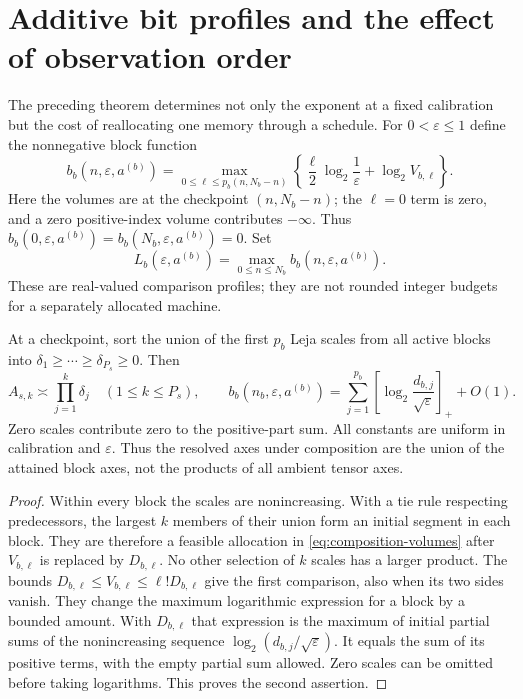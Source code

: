 \section{Additive bit profiles and the effect of observation order}\label{sec:scheduling}
The preceding theorem determines not only the exponent at a fixed
calibration but the cost of reallocating one memory through a schedule.
For $0<\varepsilon\le1$ define the nonnegative block function
\begin{equation}\label{eq:block-bit-function}
 b_b(n,\varepsilon,a^{(b)})=
 \max_{0\le\ell\le p_b(n,N_b-n)}
 \left\{\frac{\ell}{2}\log_2\frac1\varepsilon
             +\log_2 V_{b,\ell}\right\}.
\end{equation}
Here the volumes are at the checkpoint $(n,N_b-n)$; the $\ell=0$
term is zero, and a zero positive-index volume contributes $-\infty$.
Thus $b_b(0,\varepsilon,a^{(b)})=b_b(N_b,\varepsilon,a^{(b)})=0$.
Set
\[
 L_b(\varepsilon,a^{(b)})=
       \max_{0\le n\le N_b}b_b(n,\varepsilon,a^{(b)}).
\]
These are real-valued comparison profiles; they are not rounded integer
budgets for a separately allocated machine.

\begin{lemma}\label{lem:merged-scales}
At a checkpoint, sort the union of the first $p_b$ Leja scales from all
active blocks into $\delta_1\ge\cdots\ge\delta_{P_s}\ge0$. Then
\begin{equation}\label{eq:merged-scales}
 A_{s,k}\asymp\prod_{j=1}^k\delta_j\quad(1\le k\le P_s),
 \qquad
 b_b(n_b,\varepsilon,a^{(b)})=
 \sum_{j=1}^{p_b}\left[\log_2\frac{d_{b,j}}{\sqrt\varepsilon}\right]_+
       +O(1).
\end{equation}
Zero scales contribute zero to the positive-part sum. All constants are
uniform in calibration and $\varepsilon$. Thus the resolved axes under
composition are the union of the attained block axes, not the products
of all ambient tensor axes.
\end{lemma}
\begin{proof}
Within every block the scales are nonincreasing. With a tie rule respecting
predecessors, the largest $k$ members of their union form an initial
segment in each block. They are therefore a feasible allocation in
\eqref{eq:composition-volumes} after $V_{b,\ell}$ is replaced by
$D_{b,\ell}$. No other selection of $k$ scales has a larger product.
The bounds $D_{b,\ell}\le V_{b,\ell}\le\ell!D_{b,\ell}$ give
the first comparison, also when its two sides vanish. They change the
maximum logarithmic expression for a block by a bounded amount. With
$D_{b,\ell}$ that expression is the maximum of initial partial sums
of the nonincreasing sequence
$\log_2(d_{b,j}/\sqrt\varepsilon)$. It equals the sum of its positive
terms, with the empty partial sum allowed. Zero scales can be omitted
before taking logarithms. This proves the second assertion.
\end{proof}

